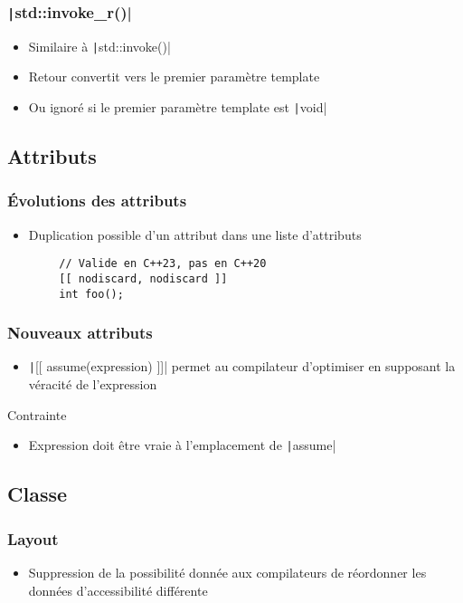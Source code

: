 \documentclass[C++.tex]{subfiles}
\begin{document}
\begin{frame}[fragile]
	\frametitle{\texttt|std::invoke_r()|}
	\begin{itemize}
		\item Similaire à \texttt|std::invoke()|
		\item Retour convertit vers le premier paramètre template
		\item Ou ignoré si le premier paramètre template est \texttt|void|
	\end{itemize}
\end{frame}

\subsection*{Attributs}
\begin{frame}[fragile]
	\frametitle{Évolutions des attributs}
	\begin{itemize}
		\item Duplication possible d'un attribut dans une liste d'attributs
	\end{itemize}

	\begin{verbatim}
		// Valide en C++23, pas en C++20
		[[ nodiscard, nodiscard ]]
		int foo();
	\end{verbatim}
\end{frame}

\begin{frame}[fragile]
	\frametitle{Nouveaux attributs}
	\begin{itemize}
		\item \texttt|[[ assume(expression) ]]| permet au compilateur d'optimiser en supposant la véracité de l'expression
	\end{itemize}

	\begin{alertblock}{Contrainte}
		\begin{itemize}
			\item Expression doit être vraie à l'emplacement de \texttt|assume|

		\end{itemize}
	\end{alertblock}
\end{frame}

\subsection*{Classe}
\begin{frame}[fragile]
	\frametitle{Layout}
	\begin{itemize}
		\item Suppression de la possibilité donnée aux compilateurs de réordonner les données d'accessibilité différente
	\end{itemize}
\end{frame}
\end{document}

